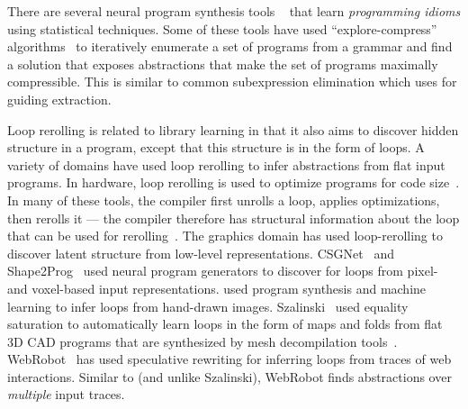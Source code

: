 There are several neural program synthesis tools%
  ~\cite{polozov, srini, learner, gredilla}
  that learn \emph{programming idioms}
  using statistical techniques.
Some of these tools have used
  ``explore-compress'' algorithms~\cite{learner} to
  iteratively enumerate a set of
  programs from a grammar and find a solution
  that exposes abstractions that make the set of
  programs maximally compressible.
This is similar to
  common subexpression elimination which \tool uses
  for guiding extraction.



%
Loop rerolling is related to library learning in that it also aims to discover hidden structure in a program,
except that this structure is in the form of loops.
%
A variety of domains have used loop rerolling
  to infer abstractions from flat input programs.
In hardware, loop rerolling is
  used to optimize programs
  for code size~\cite{hardware1, hardware2, hardware3}.
In many of these tools,
  the compiler first unrolls a loop,
  applies optimizations, then rerolls it --- the compiler
  therefore has structural information about the loop
  that can be used for rerolling~\cite{hardware1}.
The graphics domain has used
  loop-rerolling to discover
  latent structure from low-level representations.
CSGNet~\cite{csgnet} and Shape2Prog~\cite{shape2prog} used
  neural program generators to discover for loops from
  pixel- and voxel-based input representations.
\cite{handdrawn} used program synthesis
  and machine learning
  to infer loops from hand-drawn images.
Szalinski~\cite{szalinski} used
  equality saturation to
  automatically learn loops in the form
  of maps and folds
  from flat 3D CAD programs that are
  synthesized by mesh decompilation tools~\cite{reincarnate}.
WebRobot~\cite{webrobot} has used speculative
  rewriting for inferring loops from traces
  of web interactions.
Similar to \tool (and unlike Szalinski),
  WebRobot finds abstractions
  over \textit{multiple} input traces.

